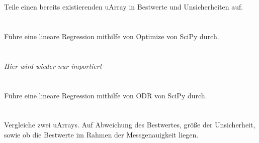 \documentclass[a4paper,12pt]{article}
\begin{document}
\section{}
Teile einen bereits existierenden uArray in Bestwerte und Unsicherheiten auf.

\section{}
Führe eine lineare Regression mithilfe von Optimize von SciPy durch.

\section{}
\textit{Hier wird wieder nur importiert}

\section{}
Führe eine lineare Regression mithilfe von ODR von SciPy durch.

\section{}
Vergleiche zwei uArrays. Auf Abweichung des Bestwertes, größe der Unsicherheit, sowie ob die Bestwerte im Rahmen der Messgenauigkeit liegen.
\end{document}
